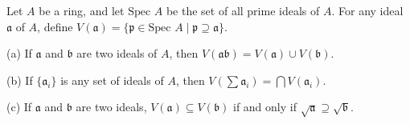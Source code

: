 Let $A$ be a ring, and let $\text{Spec } A$ be the set of all prime ideals of $A$. For any ideal $\mathfrak{a}$ of $A$, define $V(\mathfrak{a}) = \{\mathfrak{p} \in \text{Spec } A \mid \mathfrak{p} \supseteq \mathfrak{a}\}$.

(a) If $\mathfrak{a}$ and $\mathfrak{b}$ are two ideals of $A$, then $V(\mathfrak{ab}) = V(\mathfrak{a}) \cup V(\mathfrak{b})$.

(b) If $\{\mathfrak{a}_i\}$ is any set of ideals of $A$, then $V(\sum \mathfrak{a}_i) = \bigcap V(\mathfrak{a}_i)$.

(c) If $\mathfrak{a}$ and $\mathfrak{b}$ are two ideals, $V(\mathfrak{a}) \subseteq V(\mathfrak{b})$ if and only if $\sqrt{\mathfrak{a}} \supseteq \sqrt{\mathfrak{b}}$.
